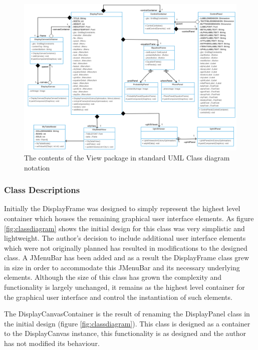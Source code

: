 \clearpage
\begin{figure}
\includegraphics[scale=0.225]{Images/chapter4/view}
\caption[View Package Class Diagram]{The contents of the View package in standard UML Class diagram notation}
\label{fig:classdiagramImp}
\end{figure}
\clearpage

\subsubsection{Class Descriptions}
\label{view:clss}
Initially the DisplayFrame was designed to simply represent the highest level container which houses the remaining graphical user interface elements. As figure \ref{fig:classdiagram} shows the initial design for this class was very simplistic and lightweight. The author's decision to include additional user interface elements which were not originally planned has resulted in modifications to the designed class. A JMenuBar has been added and as a result the DisplayFrame class grew in size in order to accommodate this JMenuBar and its necessary underlying elements. Although the size of this class has grown the complexity and functionality is largely unchanged, it remains as the highest level container for the graphical user interface and control the instantiation of such elements.

The DisplayCanvasContainer is the result of renaming the DisplayPanel class in the initial design (figure \ref{fig:classdiagram}). This class is designed as a container to the DisplayCanvas instance, this functionality is as designed and the author has not modified its behaviour.

